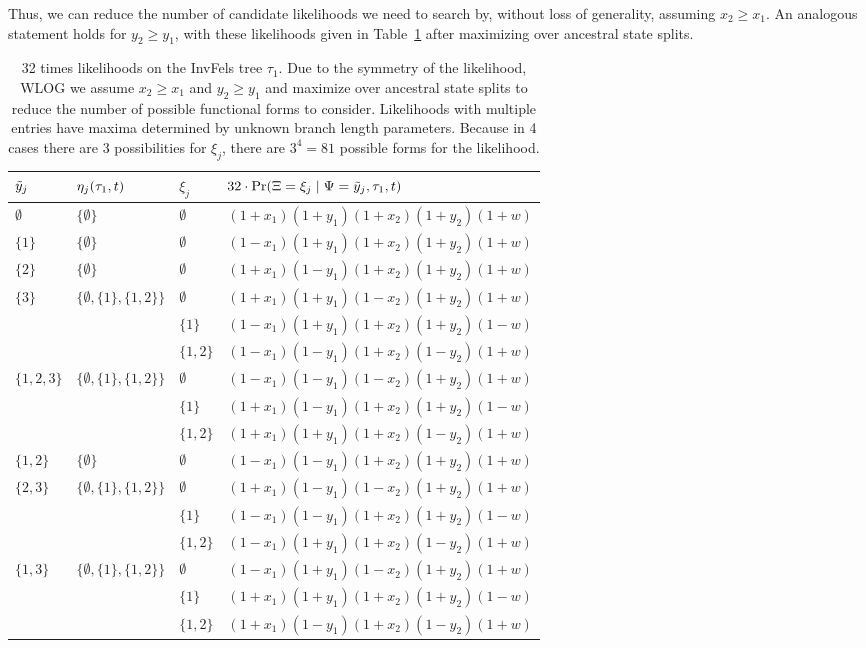 Thus, we can reduce the number of candidate likelihoods we need to search by, without loss of generality, assuming $x_2 \ge x_1$.
An analogous statement holds for $y_2 \ge y_1$, with these likelihoods given in Table~\ref{tab:likelihoods} after maximizing over ancestral state splits.

\begin{table}
\centering
\begin{tabular}{|lll|l|}
\hline
$\tilde{y}_j$ & $\eta_j(\tau_1, t)$ & $\xi_j$ & $32\cdot\Pr(\Xi=\xi_j \mid \Psi=\tilde{y}_j,\tau_1,t)$\\
\hline
$\emptyset$&$\{\emptyset\}$&$\emptyset$&$(1+x_1)(1+y_1)(1+x_2)(1+y_2)(1+w)$\\

$\{1\}$    &$\{\emptyset\}$&$\emptyset$&$(1-x_1)(1+y_1)(1+x_2)(1+y_2)(1+w)$\\

$\{2\}$    &$\{\emptyset\}$&$\emptyset$&$(1+x_1)(1-y_1)(1+x_2)(1+y_2)(1+w)$\\

$\{3\}$    &$\{\emptyset,\{1\},\{1,2\}\}$&$\emptyset$&$(1+x_1)(1+y_1)(1-x_2)(1+y_2)(1+w)$\\
&&$\{1\}$&$(1-x_1)(1+y_1)(1+x_2)(1+y_2)(1-w)$\\
&&$\{1,2\}$&$(1-x_1)(1-y_1)(1+x_2)(1-y_2)(1+w)$\\

$\{1,2,3\}$&$\{\emptyset,\{1\},\{1,2\}\}$&$\emptyset$&$(1-x_1)(1-y_1)(1-x_2)(1+y_2)(1+w)$\\
&&$\{1\}$&$(1+x_1)(1-y_1)(1+x_2)(1+y_2)(1-w)$\\
&&$\{1,2\}$&$(1+x_1)(1+y_1)(1+x_2)(1-y_2)(1+w)$\\

$\{1,2\}$  &$\{\emptyset\}$&$\emptyset$&$(1-x_1)(1-y_1)(1+x_2)(1+y_2)(1+w)$\\

$\{2,3\}$  &$\{\emptyset,\{1\},\{1,2\}\}$&$\emptyset$&$(1+x_1)(1-y_1)(1-x_2)(1+y_2)(1+w)$\\
&&$\{1\}$&$(1-x_1)(1-y_1)(1+x_2)(1+y_2)(1-w)$\\
&&$\{1,2\}$&$(1-x_1)(1+y_1)(1+x_2)(1-y_2)(1+w)$\\

$\{1,3\}$  &$\{\emptyset,\{1\},\{1,2\}\}$&$\emptyset$&$(1-x_1)(1+y_1)(1-x_2)(1+y_2)(1+w)$\\
&&$\{1\}$&$(1+x_1)(1+y_1)(1+x_2)(1+y_2)(1-w)$\\
&&$\{1,2\}$&$(1+x_1)(1-y_1)(1+x_2)(1-y_2)(1+w)$\\
\hline
\end{tabular}
\caption{
32 times likelihoods on the InvFels tree $\tau_1$.
Due to the symmetry of the likelihood, WLOG we assume $x_2 \ge x_1$ and $y_2 \ge y_1$ and maximize over ancestral state splits to reduce the number of possible functional forms to consider.
Likelihoods with multiple entries have maxima determined by unknown branch length parameters.
Because in 4 cases there are 3 possibilities for $\xi_j$, there are $3^4=81$ possible forms for the likelihood.
}
\label{tab:likelihoods}
\end{table}

